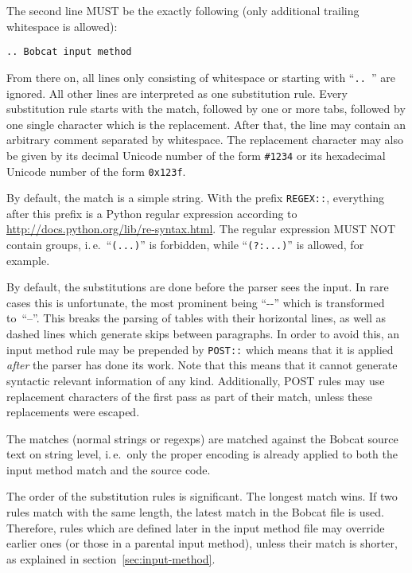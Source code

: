 \documentclass[12pt,openany]{book}
\begin{document}
The second line MUST be the exactly following (only additional trailing
whitespace is allowed):

\begin{lstlisting}
.. Bobcat input method
\end{lstlisting}

From there on, all lines only consisting of whitespace or starting with
``\verb*|.. |'' are ignored.  All other lines are interpreted as one
substitution rule.  Every substitution rule starts with the match, followed by
one or more tabs, followed by one single character which is the replacement.
After that, the line may contain an arbitrary comment separated by whitespace.
The replacement character may also be given by its decimal Unicode number of
the form \verb|#1234| or its hexadecimal Unicode number of the form
\verb|0x123f|.

By default, the match is a simple string.  With the prefix \verb|REGEX::|,
everything after this prefix is a Python regular expression according to
\url{http://docs.python.org/lib/re-syntax.html}.  The regular expression MUST
NOT contain groups, i.\,e.\ ``\verb|(...)|'' is forbidden, while
``\verb|(?:...)|'' is allowed, for example.

By default, the substitutions are done before the parser sees the input.  In
rare cases this is unfortunate, the most prominent being ``\mbox{-{}-}'' which
is transformed to~``--''.  This breaks the parsing of tables with their
horizontal lines, as well as dashed lines which generate skips between
paragraphs.  In order to avoid this, an input method rule may be prepended by
\verb|POST::| which means that it is applied \emph{after} the parser has done
its work.  Note that this means that it cannot generate syntactic relevant
information of any kind.  Additionally, POST rules may use replacement
characters of the first pass as part of their match, unless these replacements
were escaped.

The matches (normal strings or regexps) are matched against the Bobcat source
text on string level, i.\,e.\ only the proper encoding is already applied to
both the input method match and the source code.

The order of the substitution rules is significant.  The longest match wins.
If two rules match with the same length, the latest match in the Bobcat file is
used.  Therefore, rules which are defined later in the input method file may
override earlier ones (or those in a parental input method), unless their match
is shorter, as explained in section~\ref{sec:input-method}.
\end{document}
